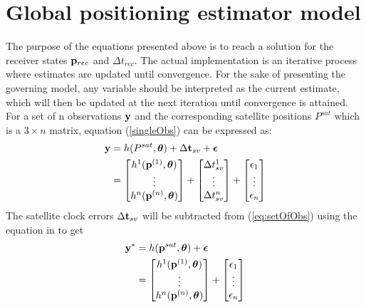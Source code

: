 \section{Global positioning estimator model}\label{stateEst}
The purpose of the equations presented above is to reach a solution for the receiver states ${\bf p}_{rec}$ and $\Delta t_{rec}$.
The actual implementation is an iterative process where estimates are updated until convergence. For the sake of presenting the governing model, any variable should be interpreted as the current estimate, which will then be updated at the next iteration until convergence is attained.
For a set of n observations ${\bf y}$ and the corresponding satellite positions $P^{sat}$ which is a $3\times n$ matrix, equation (\ref{singleObs}) can be expressed as:
\begin{align}
\textbf{y}&=h(P^{sat},{\boldsymbol \theta})+\Delta {\bf t}_{sv}+ {\boldsymbol \epsilon}\\
		  &=\begin{bmatrix} 
		  h^1({\bf p}^{(1)},{\boldsymbol \theta})\\ 
		  \vdots \\ 
		  h^n({\bf p}^{(n)},{\boldsymbol \theta}) \end{bmatrix} + \begin{bmatrix}
		  \Delta t_{sv}^1 \\ \vdots \\ \Delta t_{sv}^n
		  \end{bmatrix}+ \begin{bmatrix}
		  \epsilon_1 \\ \vdots \\ \epsilon_n
		  \end{bmatrix} \label{eq:setOfObs}
\end{align}
The satellite clock errors $\Delta {\bf t}_{sv}$ will be subtracted from (\ref{eq:setOfObs}) using the equation in \cite{dunn2012global} to get
\begin{align}
{\bf y}^*&=h({\bf p}^{sat},{\boldsymbol \theta})+ {\boldsymbol \epsilon}\\
		  &=\begin{bmatrix} 
		  h^1({\bf p}^{(1)},{\boldsymbol \theta})\\ 
		  \vdots \\ 
		  h^n({\bf p}^{(n)},{\boldsymbol \theta}) \end{bmatrix} +
		  \begin{bmatrix}
		  \epsilon_1 \\ \vdots \\ \epsilon_n
		  \end{bmatrix} \label{linearised}
\end{align}
